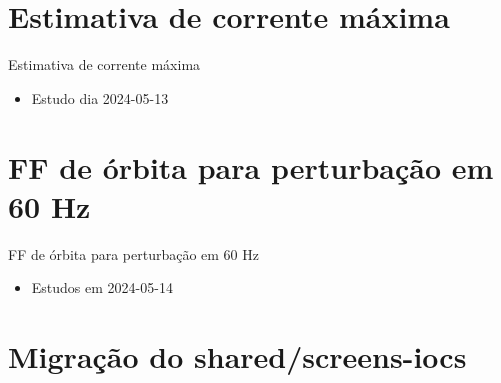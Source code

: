\documentclass[aspectratio=169]{beamer}            %
\begin{document}
\section{Estimativa de corrente máxima}

\begin{frame}{Estimativa de corrente máxima}

{\footnotesize
\begin{itemize}
    \item Estudo dia 2024-05-13
\end{itemize}
}
\end{frame}



\section{FF de órbita para perturbação em 60 Hz}

\begin{frame}{FF de órbita para perturbação em 60 Hz}

\begin{itemize}
    \setlength\itemsep{1em}
    \item Estudos em 2024-05-14
\end{itemize}

\end{frame}



\section{Migração do shared/screens-iocs}
\end{document}
